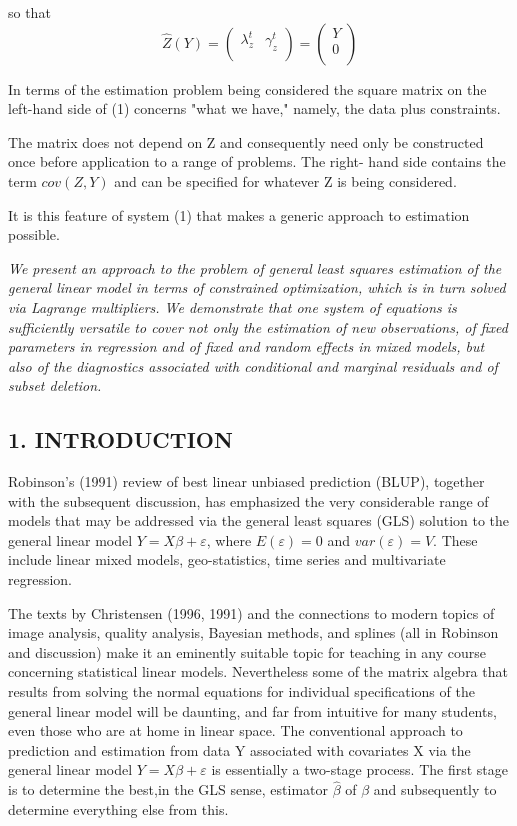 \documentclass[Main.tex]{subfiles}
\begin{document}
so that
\[ \hat{Z}(Y) =
\left(
\begin{array}{cc}
\lambda_{z}^{t}&
\gamma_z^{t} \\
\end{array}
\right)=\left(
\begin{array}{c}
Y \\
0 \\
\end{array}
\right) \]

In terms of the estimation problem being considered the square matrix on the left-hand side of (1) concerns "what we have," namely, the data plus constraints.

The matrix does not depend on Z and consequently need only be constructed once before application to a range of problems. The right- hand side contains the term $cov(Z,Y)$ and can be specified for whatever Z is being considered.

It is this feature of system (1) that makes a generic approach to estimation possible.


\newpage	
	\emph{
		We present an approach to the problem of general least squares estimation of the general linear model in terms of 
		constrained optimization, which is in turn solved via Lagrange multipliers. We demonstrate that one system of equations is sufficiently versatile to cover not only the estimation of new observations, of fixed parameters in regression and of fixed and random effects in mixed models, but also of the diagnostics associated with conditional and marginal residuals and of subset deletion. 
	}
	
\bigskip
\subsection*{1. INTRODUCTION }Robinson's (1991) review of best linear unbiased prediction (BLUP), together with the subsequent 
		discussion, has emphasized the very considerable range of models that may be addressed via the general least squares (GLS) solution to the general linear model $Y = X\beta + \varepsilon$, where $E(\varepsilon) = 0$ and $var(\varepsilon) = V$. These include linear mixed models, geo-statistics, time series and multivariate regression. 
		
		The texts by Christensen (1996, 1991) and the connections to modern topics of image analysis, quality analysis, Bayesian methods, and splines (all in Robinson and discussion) make it an eminently suitable topic for teaching in any course concerning statistical linear models. Nevertheless some of the matrix algebra that results from solving the normal equations for individual specifications of the general linear model will be daunting, and far from intuitive for many students, even those who are at home in linear space. The conventional approach to prediction and estimation from data Y associated with covariates X via the general linear model $Y = X\beta + \varepsilon$ is essentially a two-stage process.
\bigskip	
	The first stage is to determine the best,in the GLS sense, estimator $\hat{\beta}$ of $\beta$ and subsequently to determine everything else from this.
	
\end{document}
